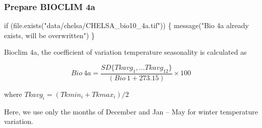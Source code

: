 \documentclass[
]{article}
\newenvironment{Shaded}{}{}
\newcommand{\ControlFlowTok}[1]{\textcolor[rgb]{0.00,0.00,1.00}{#1}}
\newcommand{\KeywordTok}[1]{\textcolor[rgb]{0.00,0.00,1.00}{#1}}
\newcommand{\NormalTok}[1]{#1}
\newcommand{\StringTok}[1]{\textcolor[rgb]{0.00,0.50,0.50}{#1}}
\begin{document}
\hypertarget{prepare-bioclim-4a}{%
\subsubsection{Prepare BIOCLIM 4a}\label{prepare-bioclim-4a}}

\begin{Shaded}
\begin{Highlighting}[]
\ControlFlowTok{if}\NormalTok{ (}\KeywordTok{file.exists}\NormalTok{(}\StringTok{"data/chelsa/CHELSA_bio10_4a.tif"}\NormalTok{)) \{}
  \KeywordTok{message}\NormalTok{(}\StringTok{"Bio 4a already exists, will be overwritten"}\NormalTok{)}
\NormalTok{\}}
\end{Highlighting}
\end{Shaded}

Bioclim 4a, the coefficient of variation temperature seasonality is calculated as

\[Bio\ 4a = \frac{SD\{ Tkavg_1, \ldots Tkavg_{12} \}}{(Bio\ 1 + 273.15)} \times 100\]

where \(Tkavg_i = (Tkmin_i + Tkmax_i) / 2\)

Here, we use only the months of December and Jan -- May for winter temperature variation.
\end{document}
